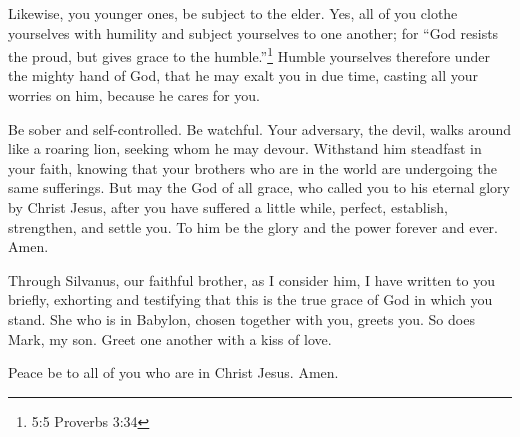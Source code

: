  Likewise, you younger ones, be subject to the elder. Yes,
all of you clothe yourselves with humility and subject yourselves to one
another; for ``God resists the proud, but gives grace to the
humble.''\footnote{5:5 Proverbs 3:34}  Humble yourselves
therefore under the mighty hand of God, that he may exalt you in due
time,  casting all your worries on him, because he cares for
you.

 Be sober and self-controlled. Be watchful. Your adversary,
the devil, walks around like a roaring lion, seeking whom he may devour.
 Withstand him steadfast in your faith, knowing that your
brothers who are in the world are undergoing the same sufferings.
 But may the God of all grace, who called you to his
eternal glory by Christ Jesus, after you have suffered a little while,
perfect, establish, strengthen, and settle you.  To him be
the glory and the power forever and ever. Amen.

 Through Silvanus, our faithful brother, as I consider him,
I have written to you briefly, exhorting and testifying that this is the
true grace of God in which you stand.  She who is in
Babylon, chosen together with you, greets you. So does Mark, my son.
 Greet one another with a kiss of love.

Peace be to all of you who are in Christ Jesus. Amen.
